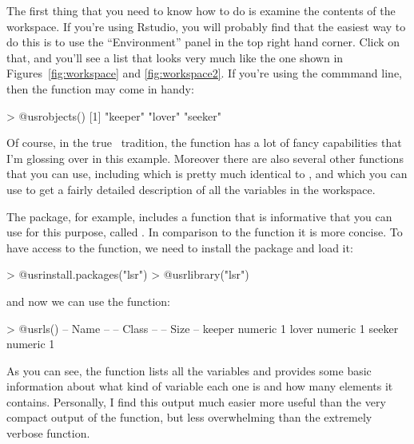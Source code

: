 The first thing that you need to know how to do is examine the contents of the workspace. If you're using Rstudio, you will probably find that the easiest way to do this is to use the ``Environment'' panel in the top right hand corner. Click on that, and you'll see a list that looks very much like the one shown in Figures~\ref{fig:workspace} and \ref{fig:workspace2}.  If you're using the commmand line, then the   function may come in handy:
\begin{rblock1}
> @usr{objects()}
[1] "keeper" "lover"  "seeker"
\end{rblock1}
Of course, in the true \R\ tradition, the  function has a lot of fancy capabilities that I'm glossing over in this example. Moreover there are also several other functions that you can use, including  which is pretty much identical to , and  which you can use to get a fairly detailed description of all the variables in the workspace. 

The  package, for example, includes a function that is informative that you can use for this purpose, called . In comparison to the  function it is more concise.
To have access to the  function, we need to install the  package and load it:
\begin{rblock1}
> @usr{install.packages("lsr")}	
> @usr{library("lsr")}
\end{rblock1}
and now we can use the  function:
\begin{rblock1}
> @usr{ls()}
   -- Name --   -- Class --   -- Size --
   keeper       numeric       1         
   lover        numeric       1         
   seeker       numeric       1         
\end{rblock1}
As you can see, the  function lists all the variables and provides some basic information about what kind of variable each one is and how many elements it contains. 
Personally, I find this output much easier more useful than the very compact output of the  function, but less overwhelming than the extremely verbose  function.



